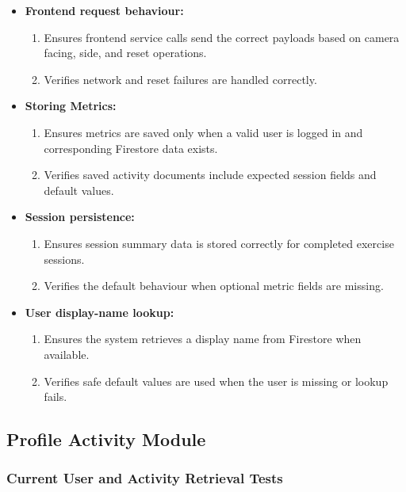 \documentclass[12pt, titlepage]{article}
\begin{document}
\begin{itemize}
    \item \textbf{Frontend request behaviour:}
    \begin{enumerate}
        \item Ensures frontend service calls send the correct payloads based on camera facing, side, and reset operations.
        \item Verifies network and reset failures are handled correctly.
    \end{enumerate}

    \item \textbf{Storing Metrics:}
    \begin{enumerate}
        \item Ensures metrics are saved only when a valid user is logged in and corresponding Firestore data exists.
        \item Verifies saved activity documents include expected session fields and default values.
    \end{enumerate}

    \item \textbf{Session persistence:}
    \begin{enumerate}
        \item Ensures session summary data is stored correctly for completed exercise sessions.
        \item Verifies the default behaviour when optional metric fields are missing.
    \end{enumerate}

    \item \textbf{User display-name lookup:}
    \begin{enumerate}
        \item Ensures the system retrieves a display name from Firestore when available.
        \item Verifies safe default values are used when the user is missing or lookup fails.
    \end{enumerate}
\end{itemize}


\subsection{Profile Activity Module}

\subsubsection{Current User and Activity Retrieval Tests}
\end{document}
